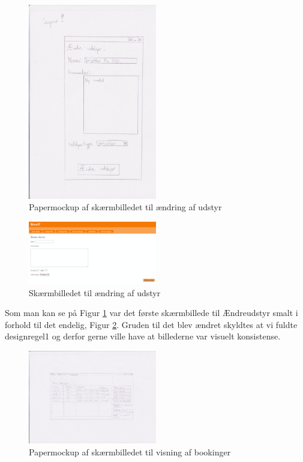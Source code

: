 \begin{figure}[h!]
  \centering
    \includegraphics[width=0.5\textwidth]{Appendix/GUI-Prototype/PaperMockup/AendreUdstyr_001}
  \caption{Papermockup af skærmbilledet til ændring af udstyr}
\label{Design_G_Development_EquipmentChange}
\end{figure} 

\begin{figure}[h!]
  \centering
    \includegraphics[width=0.5\textwidth]{Appendix/GUI-Prototype/DigitalMockup/AendreUdstyr}
  \caption{Skærmbilledet til ændring af udstyr}
\label{Design_G_Development_EquipmentChange_Final}
\end{figure} 

Som man kan se på Figur \ref{Design_G_Development_EquipmentChange} var det første skærmbillede til Ændreudstyr smalt i forhold til det endelig, Figur \ref{Design_G_Development_EquipmentChange_Final}. Gruden til det blev ændret skyldtes at vi fuldte designregel1 og derfor gerne ville have at billederne var visuelt konsistense. 

\begin{figure}[h!]
  \centering
    \includegraphics[width=0.5\textwidth]{Appendix/GUI-Prototype/PaperMockup/DineBookinger_001}
  \caption{Papermockup af skærmbilledet til visning af bookinger}
\label{Design_G_Development_YourBookings}
\end{figure} 


